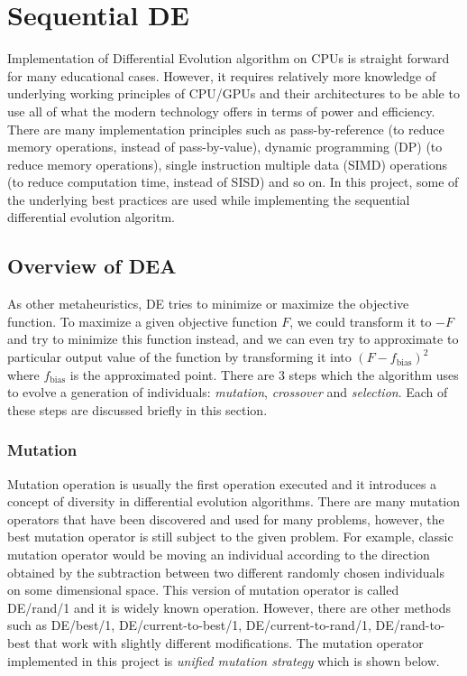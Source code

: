 \documentclass[conference]{IEEEtran}
\begin{document}
\section{Sequential DE}
Implementation of Differential Evolution algorithm on CPUs is straight forward for many educational cases. However, it requires relatively more knowledge of underlying working principles of CPU/GPUs and 
their architectures to be able to use all of what the modern technology offers in terms of power and efficiency. There are many implementation principles such as pass-by-reference 
(to reduce memory operations, instead of pass-by-value), dynamic programming (DP) (to reduce memory operations), single instruction multiple data (SIMD) operations 
(to reduce computation time, instead of SISD) and so on. In this project, some of the underlying best practices are used while implementing the sequential differential evolution algoritm. 

\subsection{Overview of DEA}
As other metaheuristics, DE tries to minimize or maximize the objective function. To maximize a given objective function $F$, we could transform it to $-F$ and try to minimize this function 
instead, and we can even try to approximate to particular output value of the function by transforming it into $(F-f_\text{bias})^2$ where $f_\text{bias}$ is the approximated point. 
There are 3 steps which the algorithm uses to evolve a generation of individuals: \textit{mutation}, \textit{crossover} and \textit{selection}. Each of these steps are discussed briefly in this section.

\subsubsection{Mutation}
Mutation operation is usually the first operation executed and it introduces a concept of diversity in differential evolution algorithms. There are many mutation operators that have been discovered 
and used for many problems, however, the best mutation operator is still subject to the given problem. For example, classic mutation operator would be moving an individual according to the direction 
obtained by the subtraction between two different randomly chosen individuals on some dimensional space. This version of mutation operator is called DE/rand/1 and it is widely known operation.
However, there are other methods such as DE/best/1, DE/current-to-best/1, DE/current-to-rand/1, DE/rand-to-best that work with slightly different modifications. The mutation operator implemented 
in this project is \textit{unified mutation strategy} \cite{b3} which is shown below.
\end{document}
